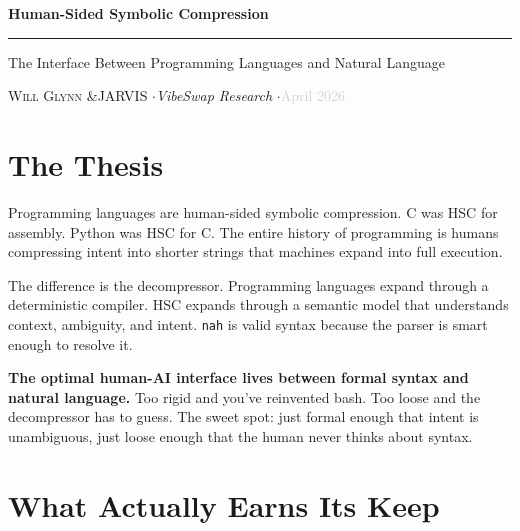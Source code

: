 \documentclass[9pt, letterpaper]{article}
\newcommand{\code}[1]{\texttt{#1}}
\begin{document}

\begin{center}
\vspace*{-0.15in}
{\Large\bfseries Human-Sided Symbolic Compression}

\vspace{3pt}
\textcolor{rule}{\rule{3.8in}{0.5pt}}
\vspace{3pt}

{\small The Interface Between Programming Languages and Natural Language}

\vspace{6pt}
{\small\textsc{Will Glynn} \enspace\&\enspace \textsc{JARVIS}%
\quad$\cdot$\quad \textit{VibeSwap Research}%
\quad$\cdot$\quad \textcolor{lightgray}{April 2026}}
\vspace{0.12in}
\end{center}


\section{The Thesis}

Programming languages are human-sided symbolic compression. C was HSC for assembly. Python was HSC for C. The entire history of programming is humans compressing intent into shorter strings that machines expand into full execution.

The difference is the decompressor. Programming languages expand through a deterministic compiler. HSC expands through a semantic model that understands context, ambiguity, and intent. \code{nah} is valid syntax because the parser is smart enough to resolve it.

\textbf{The optimal human-AI interface lives between formal syntax and natural language.} Too rigid and you've reinvented bash. Too loose and the decompressor has to guess. The sweet spot: just formal enough that intent is unambiguous, just loose enough that the human never thinks about syntax.


\section{What Actually Earns Its Keep}
\end{document}
